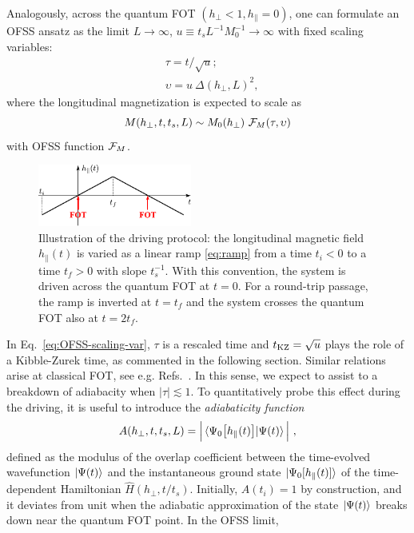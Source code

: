 Analogously, across the quantum FOT $(h_\perp<1,h_\parallel=0)$, one can formulate an OFSS ansatz as the limit  $L\to\infty$, $u\equiv  {t_s L^{-1} M_0^{-1}}\to \infty$ with fixed scaling variables:
\begin{align}\label{eq:OFSS-scaling-var}
&\tau=t/\sqrt{u};\\
\label{eq:OFSS-scaling-var2}
& \upsilon=u \ \Delta(h_\perp, L)^2 ,
\end{align}
where the longitudinal magnetization is expected to scale as
\begin{equation}\label{eq:OFSS-M}
M(h_\perp,t,t_s,L)\sim M_0(h_\perp) \  {\cal F}_M(\tau,\upsilon)
\end{equation}
with OFSS function ${\cal F}_M$. \\
\begin{figure}[t]
\centering
\includegraphics[width=0.45\textwidth]{imm/protocol.pdf}
\caption{Illustration of the driving protocol: the longitudinal magnetic field $h_\parallel(t)$ is varied as a linear ramp \eqref{eq:ramp} from a time $t_i<0$ to a time $t_f>0$ with slope $t_s^{-1}$. With this convention, the system is driven across the quantum FOT at $t=0$. For a round-trip passage, the ramp is inverted at $t=t_f$ and the system crosses the quantum FOT also at $t=2t_f$. }\label{fig:protocol}
\end{figure}
In Eq.~\eqref{eq:OFSS-scaling-var}, $\tau$ is a rescaled time and $t_{\rm KZ}=\sqrt{u}$ plays the role of a Kibble-Zurek time, as commented in the following section. Similar relations arise at classical FOT, see e.g. Refs.~\cite{pelissetto2016off,scopa2018dynamical}. In this sense, we expect to assist to a breakdown of adiabacity when $|\tau|\lesssim 1$. To quantitatively probe this effect during the driving, it is useful to introduce the {\it adiabaticity function}
\begin{equation}
	\label{eq:adiab}
	A(h_\perp,t,t_s,L) = \Big| \braket{\Psi_0\bigr[h_\parallel(t)\bigr]|\Psi(t)} \Big| \,\,,
\end{equation}
defined as the modulus of the overlap coefficient between the time-evolved wavefunction $\ket{\Psi(t)}$ and the instantaneous ground state $\ket{\Psi_0[h_\parallel(t)]}$ of the time-dependent Hamiltonian $\hat{H}(h_\perp,t/t_s)$. Initially, $A(t_i)=1$ by construction, and it deviates from unit when the adiabatic approximation of the state $\ket{\Psi(t)}$ breaks down near the quantum FOT point. In the OFSS limit,
